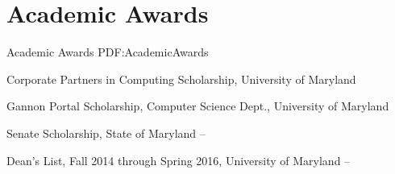 
\section
{Academic Awards}
{Academic Awards}
{PDF:AcademicAwards}

\BulletItem
Corporate Partners in Computing Scholarship,
University of Maryland
\hfill
{}

\GapNoBreak
\BulletItem
Gannon Portal Scholarship,
Computer Science Dept., 
University of Maryland
\hfill
{}

\GapNoBreak
\BulletItem
Senate Scholarship,
State of Maryland
\hfill
{} --

\GapNoBreak
\BulletItem
Dean's List,
Fall 2014 through Spring 2016,
University of Maryland
\hfill
{} --
\Gap
